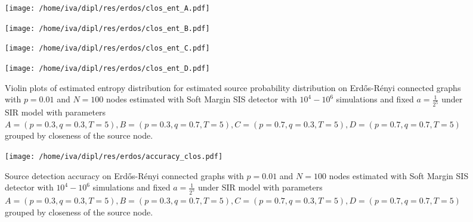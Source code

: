 \documentclass[times, utf8, diplomski]{fer}
\begin{document}
\begin{figure}[H]
\begin{minipage}{\textwidth}
\begin{minipage}{0.5\textwidth}
\texttt{[image: /home/iva/dipl/res/erdos/clos\_ent\_A.pdf]}
\end{minipage}
\begin{minipage}{0.5\textwidth}
\texttt{[image: /home/iva/dipl/res/erdos/clos\_ent\_B.pdf]}
\end{minipage}
\begin{minipage}{0.5\textwidth}
\texttt{[image: /home/iva/dipl/res/erdos/clos\_ent\_C.pdf]}
\end{minipage}
\begin{minipage}{0.5\textwidth}
\texttt{[image: /home/iva/dipl/res/erdos/clos\_ent\_D.pdf]}
\end{minipage}
\caption{Violin plots of estimated entropy distribution for estimated source probability distribution on  Erd{\H{o}}s-R{\'{e}}nyi connected graphs with $p=0.01$ and $N=100$ nodes estimated with Soft Margin SIS detector with $10^4 - 10^6$ simulations and fixed $a = \frac{1}{2^5}$ under SIR model with parameters $A = (p=0.3, q=0.3, T=5), B = (p=0.3, q=0.7, T=5), C = (p=0.7, q=0.3, T=5), D = (p=0.7, q=0.7, T=5)$ grouped by closeness of the source node.}
\label{clos_ent}
\end{minipage}
\begin{minipage}{\textwidth}
\center
\texttt{[image: /home/iva/dipl/res/erdos/accuracy\_clos.pdf]}
\caption{Source detection accuracy on  Erd{\H{o}}s-R{\'{e}}nyi connected graphs with $p=0.01$ and $N=100$ nodes estimated with Soft Margin SIS detector with $10^4 - 10^6$ simulations and fixed $a = \frac{1}{2^5}$ under SIR model with parameters $A = (p=0.3, q=0.3, T=5), B = (p=0.3, q=0.7, T=5), C = (p=0.7, q=0.3, T=5), D = (p=0.7, q=0.7, T=5)$ grouped by closeness of the source node.}
\label{accuracy_clos}
\end{minipage}
\end{figure}
\end{document}
